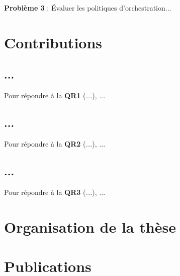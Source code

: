 \textbf{Problème 3} : Évaluer les politiques d'orchestration...


\section{Contributions}

\subsection{...}

Pour répondre à la \textbf{QR1} (\textit{...}), ...

\subsection{...}

Pour répondre à la \textbf{QR2} (\textit{...}), ...

\subsection{...}

Pour répondre à la \textbf{QR3} (\textit{...}), ...

\section{Organisation de la thèse}

\section{Publications}

